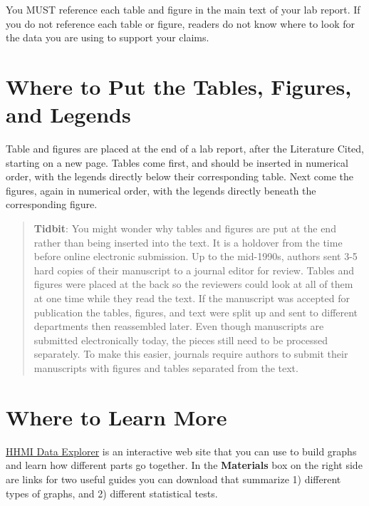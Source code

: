 \documentclass[
]{book}
\begin{document}
You MUST reference each table and figure in the main text of your lab report. If you do not reference each table or figure, readers do not know where to look for the data you are using to support your claims.

\hypertarget{where-to-put-the-tables-figures-and-legends}{%
\section{Where to Put the Tables, Figures, and Legends}\label{where-to-put-the-tables-figures-and-legends}}

Table and figures are placed at the end of a lab report, after the Literature Cited, starting on a new page. Tables come first, and should be inserted in numerical order, with the legends directly below their corresponding table. Next come the figures, again in numerical order, with the legends directly beneath the corresponding figure.

\begin{quote}
\textbf{Tidbit}: You might wonder why tables and figures are put at the end rather than being inserted into the text. It is a holdover from the time before online electronic submission. Up to the mid-1990s, authors sent 3-5 hard copies of their manuscript to a journal editor for review. Tables and figures were placed at the back so the reviewers could look at all of them at one time while they read the text. If the manuscript was accepted for publication the tables, figures, and text were split up and sent to different departments then reassembled later. Even though manuscripts are submitted electronically today, the pieces still need to be processed separately. To make this easier, journals require authors to submit their manuscripts with figures and tables separated from the text.
\end{quote}

\hypertarget{where-to-learn-more-2}{%
\section{Where to Learn More}\label{where-to-learn-more-2}}

\href{https://www.biointeractive.org/classroom-resources/data-explorer}{HHMI Data Explorer} is an interactive web site that you can use to build graphs and learn how different parts go together. In the \textbf{Materials} box on the right side are links for two useful guides you can download that summarize 1) different types of graphs, and 2) different statistical tests.
\end{document}
